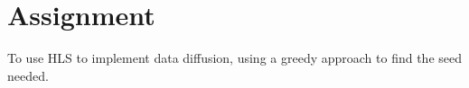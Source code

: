 \section{Assignment}
To use HLS to implement data diffusion, using a greedy approach to find the seed needed.